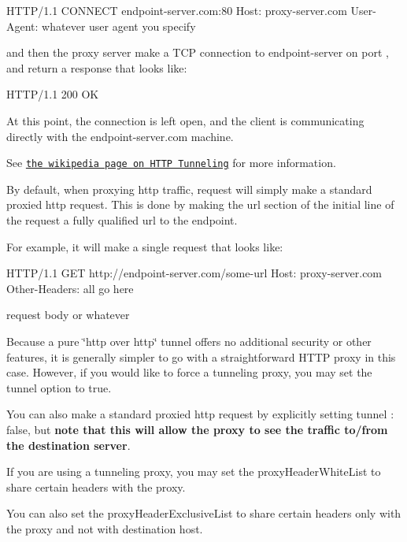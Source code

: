 \begin{DoxyCode}
HTTP/1.1 CONNECT endpoint-server.com:80
Host: proxy-server.com
User-Agent: whatever user agent you specify
\end{DoxyCode}


and then the proxy server make a T\+CP connection to {\ttfamily endpoint-\/server} on port {}, and return a response that looks like\+:


\begin{DoxyCode}
HTTP/1.1 200 OK
\end{DoxyCode}


At this point, the connection is left open, and the client is communicating directly with the {\ttfamily endpoint-\/server.\+com} machine.

See \href{https://en.wikipedia.org/wiki/HTTP_tunnel}{\tt the wikipedia page on H\+T\+TP Tunneling} for more information.

By default, when proxying {\ttfamily http} traffic, request will simply make a standard proxied {\ttfamily http} request. This is done by making the {\ttfamily url} section of the initial line of the request a fully qualified url to the endpoint.

For example, it will make a single request that looks like\+:


\begin{DoxyCode}
HTTP/1.1 GET http://endpoint-server.com/some-url
Host: proxy-server.com
Other-Headers: all go here

request body or whatever
\end{DoxyCode}


Because a pure \char`\"{}http over http\char`\"{} tunnel offers no additional security or other features, it is generally simpler to go with a straightforward H\+T\+TP proxy in this case. However, if you would like to force a tunneling proxy, you may set the {\ttfamily tunnel} option to {\ttfamily true}.

You can also make a standard proxied {\ttfamily http} request by explicitly setting {\ttfamily tunnel \+: false}, but {\bfseries note that this will allow the proxy to see the traffic to/from the destination server}.

If you are using a tunneling proxy, you may set the {\ttfamily proxy\+Header\+White\+List} to share certain headers with the proxy.

You can also set the {\ttfamily proxy\+Header\+Exclusive\+List} to share certain headers only with the proxy and not with destination host.

